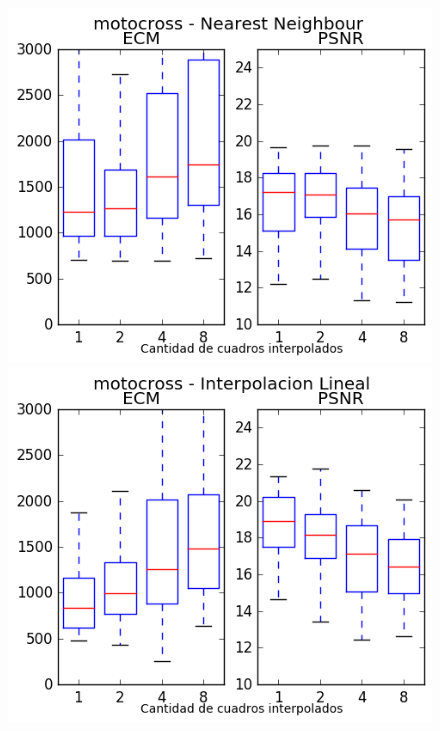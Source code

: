 \begin{figure}[H]
\centering
\begin{minipage}{0.35\textwidth}
    \includegraphics[width=1\textwidth]{imgs/resultados_error/motocross_0.png}
\end{minipage}%
\begin{minipage}{0.35\textwidth}   
    \includegraphics[width=1\textwidth]{imgs/resultados_error/motocross_1.png} 
\end{minipage}
\end{figure}
